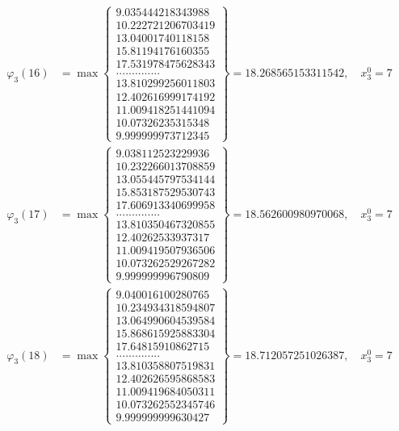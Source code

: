 \documentclass{article}
\begin{document}
\begin{align*}
  
  
  
\varphi_{3}(16) &= \max \left\{ \begin{array}{c}
9.035444218343988 \\
 10.222721206703419 \\
 13.04001740118158 \\
 15.81194176160355 \\
 17.531978475628343 \\
 .............. \\
 13.810299256011803 \\
 12.402616999174192 \\
 11.009418251441094 \\
 10.07326235315348 \\
 9.999999973712345
\end{array} \right\} = 18.268565153311542, \quad x_{3}^0 = 7\\
  
  
  
  
\varphi_{3}(17) &= \max \left\{ \begin{array}{c}
9.038112523229936 \\
 10.232266013708859 \\
 13.055445797534144 \\
 15.853187529530743 \\
 17.606913340699958 \\
 .............. \\
 13.810350467320855 \\
 12.40262533937317 \\
 11.009419507936506 \\
 10.073262529267282 \\
 9.999999996790809
\end{array} \right\} = 18.562600980970068, \quad x_{3}^0 = 7\\
  
  
  
  
\varphi_{3}(18) &= \max \left\{ \begin{array}{c}
9.040016100280765 \\
 10.234934318594807 \\
 13.064990604539584 \\
 15.868615925883304 \\
 17.64815910862715 \\
 .............. \\
 13.810358807519831 \\
 12.402626595868583 \\
 11.009419684050311 \\
 10.073262552345746 \\
 9.999999999630427
\end{array} \right\} = 18.712057251026387, \quad x_{3}^0 = 7\\
  

\end{align*}
\end{document}
